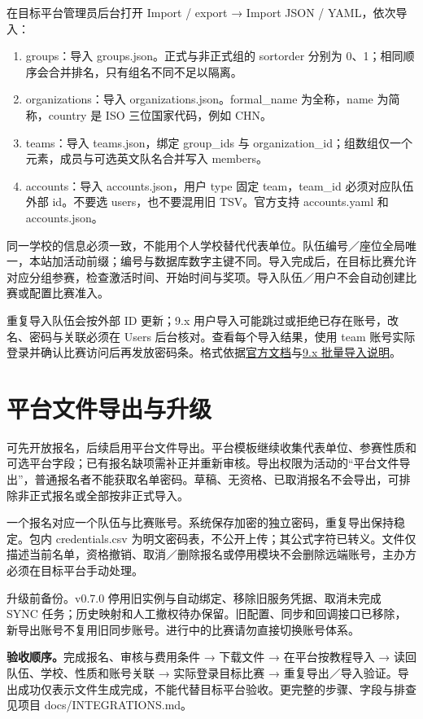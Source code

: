 \documentclass[UTF8,fontset=fandol,a4paper,11pt]{ctexart}
\begin{document}
在目标平台管理员后台打开 Import / export → Import JSON / YAML，依次导入：
\begin{enumerate}
\item groups：导入 groups.json。正式与非正式组的 sortorder 分别为 0、1；相同顺序会合并排名，只有组名不同不足以隔离。
\item organizations：导入 organizations.json。formal\_name 为全称，name 为简称，country 是 ISO 三位国家代码，例如 CHN。
\item teams：导入 teams.json，绑定 group\_ids 与 organization\_id；组数组仅一个元素，成员与可选英文队名合并写入 members。
\item accounts：导入 accounts.json，用户 type 固定 team，team\_id 必须对应队伍外部 id。不要选 users，也不要混用旧 TSV。官方支持 accounts.yaml 和 accounts.json。
\end{enumerate}
同一学校的信息必须一致，不能用个人学校替代代表单位。队伍编号／座位全局唯一，本站加活动前缀；编号与数据库数字主键不同。导入完成后，在目标比赛允许对应分组参赛，检查激活时间、开始时间与奖项。导入队伍／用户不会自动创建比赛或配置比赛准入。

重复导入队伍会按外部 ID 更新；9.x 用户导入可能跳过或拒绝已存在账号，改名、密码与关联必须在 Users 后台核对。查看每个导入结果，使用 team 账号实际登录并确认比赛访问后再发放密码条。格式依据\href{https://www.domjudge.org/documentation}{官方文档}与\href{https://github.com/DOMjudge/domjudge/blob/9.0.1/doc/manual/import.rst}{9.x 批量导入说明}。

\newpage
\section{平台文件导出与升级}
可先开放报名，后续启用平台文件导出。平台模板继续收集代表单位、参赛性质和可选平台字段；已有报名缺项需补正并重新审核。导出权限为活动的“平台文件导出”，普通报名者不能获取名单密码。草稿、无资格、已取消报名不会导出，可排除非正式报名或全部按非正式导入。

一个报名对应一个队伍与比赛账号。系统保存加密的独立密码，重复导出保持稳定。包内 credentials.csv 为明文密码表，不公开上传；其公式字符已转义。文件仅描述当前名单，资格撤销、取消／删除报名或停用模块不会删除远端账号，主办方必须在目标平台手动处理。

升级前备份。v0.7.0 停用旧实例与自动绑定、移除旧服务凭据、取消未完成 SYNC 任务；历史映射和人工撤权待办保留。旧配置、同步和回调接口已移除，新导出账号不复用旧同步账号。进行中的比赛请勿直接切换账号体系。

\textbf{验收顺序。}完成报名、审核与费用条件 → 下载文件 → 在平台按教程导入 → 读回队伍、学校、性质和账号关联 → 实际登录目标比赛 → 重复导出／导入验证。导出成功仅表示文件生成完成，不能代替目标平台验收。更完整的步骤、字段与排查见项目 docs/INTEGRATIONS.md。
\end{document}
